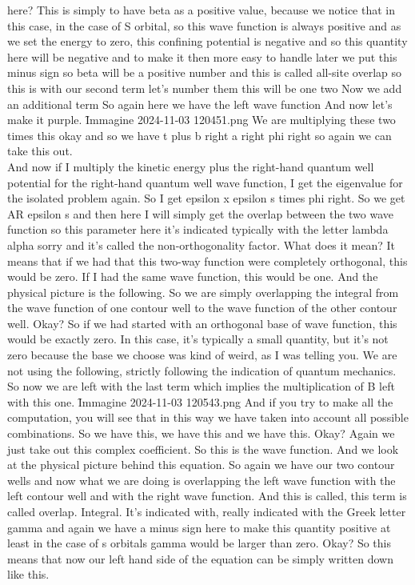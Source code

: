 here? This is simply to have beta as a positive value, because we notice that in this case, in the case of S orbital, so this wave function is always positive and as we set the energy to zero, this confining potential is negative and so this quantity here will be negative and to make it then more easy to handle later we put this minus sign so beta will be a positive number and this is called all-site overlap so this is with our second term let's number them this will be one two Now we add an additional term So again here we have the left wave function And now let's make it purple.
\f{Immagine 2024-11-03 120451.png}
We are multiplying these two times this okay and so we have t plus b right a right phi right so again we can take this out.\\
And now if I multiply the kinetic energy plus the right-hand quantum well potential for the right-hand quantum well wave function, I get the eigenvalue for the isolated problem again. So I get epsilon x epsilon s times phi right. So we get AR epsilon s and then here I will simply get the overlap between the two wave function so this parameter here it's indicated typically with the letter lambda alpha sorry and it's called the non-orthogonality factor. What does it mean? It means that if we had that this two-way function were completely orthogonal, this would be zero. If I had the same wave function, this would be one. And the physical picture is the following. So we are simply overlapping the integral from the wave function of one contour well to the wave function of the other contour well. Okay? So if we had started with an orthogonal base of wave function, this would be exactly zero. In this case, it's typically a small quantity, but it's not zero because the base we choose was kind of weird, as I was telling you. We are not using the following, strictly following the indication of quantum mechanics. So now we are left with the last term which implies the multiplication of B left with this one.
\f{Immagine 2024-11-03 120543.png}
And if you try to make all the computation, you will see that in this way we have taken into account all possible combinations. So we have this, we have this and we have this. Okay? Again we just take out this complex coefficient. So this is the wave function. And we look at the physical picture behind this equation. So again we have our two contour wells and now what we are doing is overlapping the left wave function with the left contour well and with the right wave function. And this is called, this term is called overlap. Integral. It's indicated with, really indicated with the Greek letter gamma and again we have a minus sign here to make this quantity positive at least in the case of s orbitals gamma would be larger than zero. Okay? So this means that now our left hand side of the equation can be simply written down like this.
